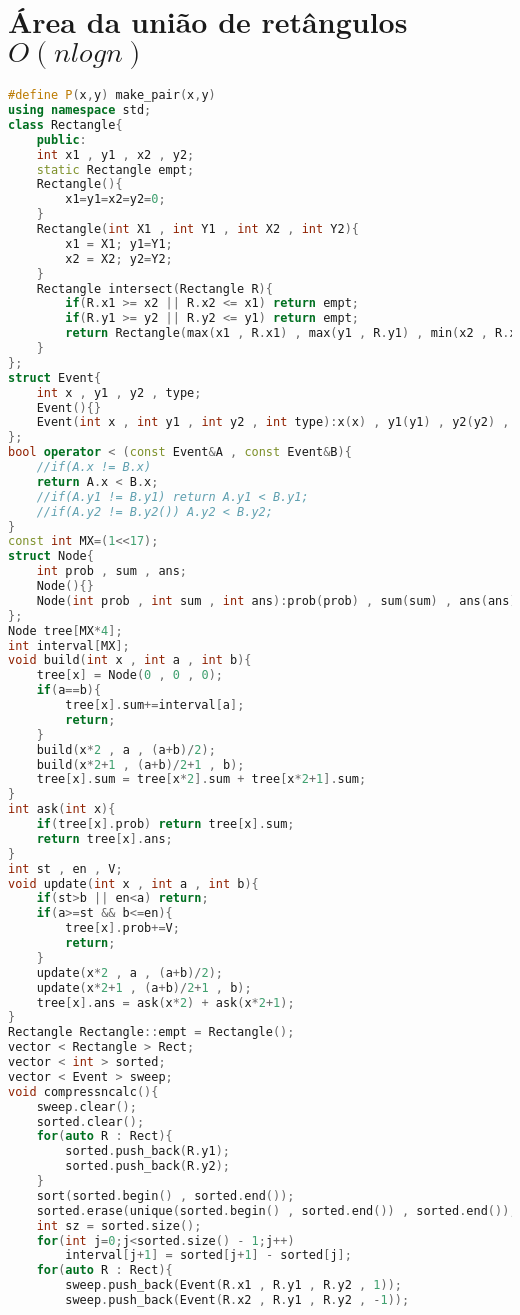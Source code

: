 \documentclass[12pt,a4paper, twoside]{report}
\begin{document}
\section{Área da união de retângulos $O(n log n)$}
\noindent\begin{lstlisting}[caption=Área da união de retângulos (N log N),language=C++]
#define P(x,y) make_pair(x,y)
using namespace std;
class Rectangle{
    public:
    int x1 , y1 , x2 , y2;
    static Rectangle empt;
    Rectangle(){
        x1=y1=x2=y2=0;
    }
    Rectangle(int X1 , int Y1 , int X2 , int Y2){
        x1 = X1; y1=Y1;
        x2 = X2; y2=Y2;
    }
    Rectangle intersect(Rectangle R){
        if(R.x1 >= x2 || R.x2 <= x1) return empt;
        if(R.y1 >= y2 || R.y2 <= y1) return empt;
        return Rectangle(max(x1 , R.x1) , max(y1 , R.y1) , min(x2 , R.x2) , min(y2 , R.y2));
    }
};
struct Event{
    int x , y1 , y2 , type;
    Event(){}
    Event(int x , int y1 , int y2 , int type):x(x) , y1(y1) , y2(y2) , type(type){}
};
bool operator < (const Event&A , const Event&B){
    //if(A.x != B.x)
    return A.x < B.x;
    //if(A.y1 != B.y1) return A.y1 < B.y1;
    //if(A.y2 != B.y2()) A.y2 < B.y2;
}
const int MX=(1<<17);
struct Node{
    int prob , sum , ans;
    Node(){}
    Node(int prob , int sum , int ans):prob(prob) , sum(sum) , ans(ans){}
};
Node tree[MX*4];
int interval[MX];
void build(int x , int a , int b){
    tree[x] = Node(0 , 0 , 0);
    if(a==b){
        tree[x].sum+=interval[a];
        return;
    }
    build(x*2 , a , (a+b)/2);
    build(x*2+1 , (a+b)/2+1 , b);
    tree[x].sum = tree[x*2].sum + tree[x*2+1].sum;
}
int ask(int x){
    if(tree[x].prob) return tree[x].sum;
    return tree[x].ans;
}
int st , en , V;
void update(int x , int a , int b){
    if(st>b || en<a) return;
    if(a>=st && b<=en){
        tree[x].prob+=V;
        return;
    }
    update(x*2 , a , (a+b)/2);
    update(x*2+1 , (a+b)/2+1 , b);
    tree[x].ans = ask(x*2) + ask(x*2+1);
}
Rectangle Rectangle::empt = Rectangle();
vector < Rectangle > Rect;
vector < int > sorted;
vector < Event > sweep;
void compressncalc(){
    sweep.clear();
    sorted.clear();
    for(auto R : Rect){
        sorted.push_back(R.y1);
        sorted.push_back(R.y2);
    }
    sort(sorted.begin() , sorted.end());
    sorted.erase(unique(sorted.begin() , sorted.end()) , sorted.end());
    int sz = sorted.size();
    for(int j=0;j<sorted.size() - 1;j++)
        interval[j+1] = sorted[j+1] - sorted[j];
    for(auto R : Rect){
        sweep.push_back(Event(R.x1 , R.y1 , R.y2 , 1));
        sweep.push_back(Event(R.x2 , R.y1 , R.y2 , -1));

\end{lstlisting}
\end{document}
